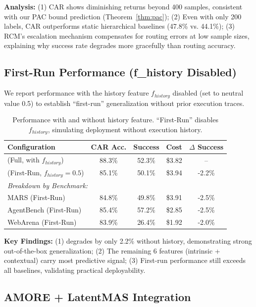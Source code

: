 \documentclass{article}
\theoremstyle{plain}
\theoremstyle{definition}
\theoremstyle{remark}
\begin{document}
\textbf{Analysis:} (1) CAR shows diminishing returns beyond 400 samples, consistent with our PAC bound prediction (Theorem~\ref{thm:pac}); (2) Even with only 200 labels, CAR outperforms static hierarchical baselines (47.8\% vs. 44.1\%); (3) RCM's escalation mechanism compensates for routing errors at low sample sizes, explaining why success rate degrades more gracefully than routing accuracy.

\subsection{First-Run Performance (f\_history Disabled)}
\label{sec:first_run}

We report performance with the history feature $f_{history}$ disabled (set to neutral value 0.5) to establish ``first-run'' generalization without prior execution traces.

\begin{table}[h]
	\caption{Performance with and without history feature. ``First-Run'' disables $f_{history}$, simulating deployment without execution history.}
	\label{tab:history_ablation}
	\centering
	\small
	\begin{tabular}{@{}lcccc@{}}
		\toprule
		\textbf{Configuration} & \textbf{CAR Acc.} & \textbf{Success} & \textbf{Cost} & \textbf{$\Delta$ Success} \\
		\midrule
		\amore{} (Full, with $f_{history}$) & 88.3\% & 52.3\% & \$3.82 & -- \\
		\amore{} (First-Run, $f_{history}=0.5$) & 85.1\% & 50.1\% & \$3.94 & -2.2\% \\
		\midrule
		\multicolumn{5}{l}{\textit{Breakdown by Benchmark:}} \\
		\quad MARS (First-Run) & 84.8\% & 49.8\% & \$3.91 & -2.5\% \\
		\quad AgentBench (First-Run) & 85.4\% & 57.2\% & \$2.85 & -2.5\% \\
		\quad WebArena (First-Run) & 83.9\% & 26.4\% & \$1.92 & -2.0\% \\
		\bottomrule
	\end{tabular}
\end{table}

\textbf{Key Findings:} (1) \amore{} degrades by only 2.2\% without history, demonstrating strong out-of-the-box generalization; (2) The remaining 6 features (intrinsic + contextual) carry most predictive signal; (3) First-run performance still exceeds all baselines, validating practical deployability.

\subsection{AMORE + LatentMAS Integration}
\label{sec:latentmas_integration}
\end{document}
